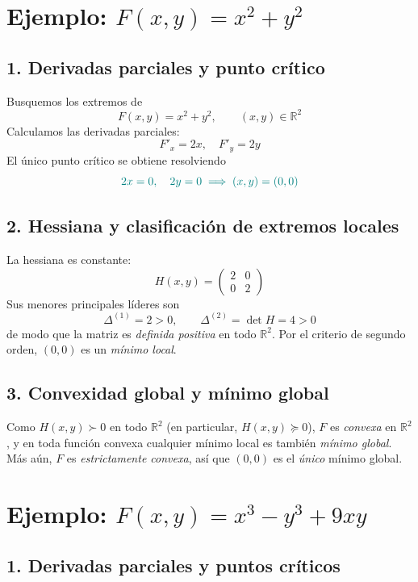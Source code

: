 \documentclass{article}
\newcommand{\R}{\ensuremath{\mathbb{R}}}
\begin{document}
\section*{Ejemplo: \(F(x,y)=x^2+y^2\)}

\subsection*{1. Derivadas parciales y punto crítico}

Busquemos los extremos de
\[
F(x,y)=x^2+y^2,\qquad (x,y)\in\R^2
\]
Calculamos las derivadas parciales:
\[
F'_x=2x,\quad F'_y=2y
\]
El único punto crítico se obtiene resolviendo
\[ \color{teal}
2x=0,\quad 2y=0
\;\Longrightarrow\;
(x,y)=(0,0)
\]

\subsection*{2. Hessiana y clasificación de extremos locales}

La hessiana es constante:
\[
H(x,y)
=
\begin{pmatrix}
2 & 0\\[4pt]
0 & 2
\end{pmatrix}
\]
Sus menores principales líderes son
\[
\Delta^{(1)}=2>0,\qquad
\Delta^{(2)}=\det H=4>0
\]
de modo que la matriz es \emph{definida positiva} en todo \(\R^2\). Por el criterio de segundo orden, \((0,0)\) es un \emph{mínimo local}.

\subsection*{3. Convexidad global y mínimo global}

Como \(H(x,y)\succ 0\) en todo \(\R^2\) (en particular, \(H(x,y)\succeq 0\)), \(F\) es \emph{convexa} en \(\R^2\), y en toda función convexa cualquier mínimo local es también \emph{mínimo global}. Más aún, \(F\) es \emph{estrictamente convexa}, así que \((0,0)\) es el \emph{único} mínimo global.

\medskip




\section*{Ejemplo: \(F(x,y)=x^3 - y^3 + 9xy\)}

\subsection*{1. Derivadas parciales y puntos críticos}
\end{document}
